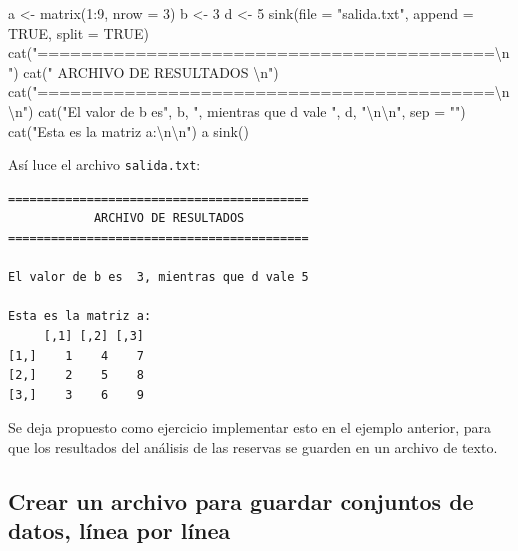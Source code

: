 \documentclass[
]{book}
\newenvironment{Shaded}{\begin{snugshade}}{\end{snugshade}}
\newcommand{\AttributeTok}[1]{\textcolor[rgb]{0.77,0.63,0.00}{#1}}
\newcommand{\ConstantTok}[1]{\textcolor[rgb]{0.00,0.00,0.00}{#1}}
\newcommand{\DecValTok}[1]{\textcolor[rgb]{0.00,0.00,0.81}{#1}}
\newcommand{\FunctionTok}[1]{\textcolor[rgb]{0.00,0.00,0.00}{#1}}
\newcommand{\NormalTok}[1]{#1}
\newcommand{\OtherTok}[1]{\textcolor[rgb]{0.56,0.35,0.01}{#1}}
\newcommand{\SpecialCharTok}[1]{\textcolor[rgb]{0.00,0.00,0.00}{#1}}
\newcommand{\StringTok}[1]{\textcolor[rgb]{0.31,0.60,0.02}{#1}}
\begin{document}
\begin{Shaded}
\begin{Highlighting}[]
\NormalTok{a }\OtherTok{\textless{}{-}} \FunctionTok{matrix}\NormalTok{(}\DecValTok{1}\SpecialCharTok{:}\DecValTok{9}\NormalTok{, }\AttributeTok{nrow =} \DecValTok{3}\NormalTok{)}
\NormalTok{b }\OtherTok{\textless{}{-}} \DecValTok{3}
\NormalTok{d }\OtherTok{\textless{}{-}} \DecValTok{5}
\FunctionTok{sink}\NormalTok{(}\AttributeTok{file =} \StringTok{"salida.txt"}\NormalTok{, }\AttributeTok{append =} \ConstantTok{TRUE}\NormalTok{, }\AttributeTok{split =} \ConstantTok{TRUE}\NormalTok{)}
\FunctionTok{cat}\NormalTok{(}\StringTok{"==========================================}\SpecialCharTok{\textbackslash{}n}\StringTok{"}\NormalTok{)}
\FunctionTok{cat}\NormalTok{(}\StringTok{"            ARCHIVO DE RESULTADOS         }\SpecialCharTok{\textbackslash{}n}\StringTok{"}\NormalTok{)}
\FunctionTok{cat}\NormalTok{(}\StringTok{"==========================================}\SpecialCharTok{\textbackslash{}n\textbackslash{}n}\StringTok{"}\NormalTok{)}
\FunctionTok{cat}\NormalTok{(}\StringTok{"El valor de b es"}\NormalTok{, b, }\StringTok{", mientras que d vale "}\NormalTok{, d, }\StringTok{"}\SpecialCharTok{\textbackslash{}n\textbackslash{}n}\StringTok{"}\NormalTok{, }\AttributeTok{sep =} \StringTok{""}\NormalTok{)}
\FunctionTok{cat}\NormalTok{(}\StringTok{"Esta es la matriz a:}\SpecialCharTok{\textbackslash{}n\textbackslash{}n}\StringTok{"}\NormalTok{)}
\NormalTok{a}
\FunctionTok{sink}\NormalTok{()}
\end{Highlighting}
\end{Shaded}

Así luce el archivo \texttt{salida.txt}:

\begin{verbatim}
==========================================
            ARCHIVO DE RESULTADOS         
==========================================

El valor de b es  3, mientras que d vale 5 

Esta es la matriz a:
     [,1] [,2] [,3]
[1,]    1    4    7
[2,]    2    5    8
[3,]    3    6    9
\end{verbatim}

Se deja propuesto como ejercicio implementar esto en el ejemplo anterior, para que los resultados del análisis de las reservas se guarden en un archivo de texto.

\hypertarget{crear-un-archivo-para-guardar-conjuntos-de-datos-luxednea-por-luxednea}{%
\subsection{Crear un archivo para guardar conjuntos de datos, línea por línea}\label{crear-un-archivo-para-guardar-conjuntos-de-datos-luxednea-por-luxednea}}
\end{document}

